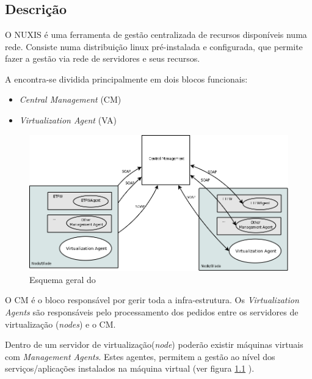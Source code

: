 \chapter{\textsf{\acronym}}
\section*{Descrição}
O NUXIS é uma ferramenta de gestão centralizada de recursos disponíveis numa rede. Consiste numa distribuição linux pré-instalada e configurada, que permite fazer a gestão via rede de servidores e seus recursos.

A \acronym encontra-se dividida principalmente em dois blocos funcionais:

\begin{itemize}
	\item \emph{Central Management} (CM)
        \item \emph{Virtualization Agent} (VA)
\end{itemize}

\begin{figure}[H]
	\begin{center}
	\includegraphics[scale=0.35]{screenshots/etva_blocos.png}
	\caption{Esquema geral do \acronym}
	\label{fig:etva_blocos}
	\end{center}
\end{figure}

O CM é o bloco responsável por gerir toda a infra-estrutura.
Os \emph{Virtualization Agents} são responsáveis pelo processamento dos pedidos entre os servidores de virtualização (\emph{nodes}) e o CM.

Dentro de um servidor de virtualização(\emph{node}) poderão existir máquinas virtuais com \emph{Management Agents}. Estes agentes, permitem a gestão ao nível dos serviços/aplicações instalados na máquina virtual (ver figura \ref{fig:etva_blocos} ).


